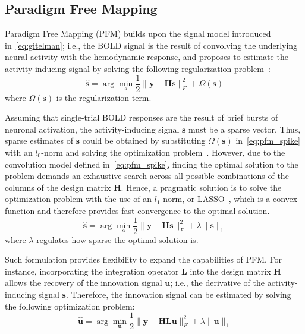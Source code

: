 \subsection{Paradigm Free Mapping}

Paradigm Free Mapping (PFM) builds upon the signal model introduced in~\eqref{eq:gitelman}; i.e., the BOLD signal is the result of convolving the underlying neural activity with the hemodynamic response, and proposes to estimate the activity-inducing signal by solving the following regularization problem~\cite{gaudes2011detection,gaudes2013paradigm,urunuela2020stability}:
\begin{equation}
    \label{eq:pfm}
    \hat{\mathbf{s}} = \arg \min_{\mathbf{s}} \frac{1}{2} \| \mathbf{y} - \mathbf{Hs} \|_F^2 + \Omega(\mathbf{s})
\end{equation}
where \(\Omega(\mathbf{s})\) is the regularization term.

Assuming that single-trial BOLD responses are the result of brief bursts of neuronal activation, the activity-inducing signal \(\mathbf{s}\) must be a sparse vector. Thus, sparse estimates of \(\mathbf{s}\) could be obtained by substituting \(\Omega(\mathbf{s})\) in~\eqref{eq:pfm_spike} with an \(l_0\)-norm and solving the optimization problem~\cite{bruckstein2009sparse}. However, due to the convolution model defined in~\eqref{eq:pfm_spike}, finding the optimal solution to the problem demands an exhaustive search across all possible combinations of the columns of the design matrix \(\mathbf{H}\). Hence, a pragmatic solution is to solve the optimization problem with the use of an \(l_1\)-norm, or LASSO~\cite{tibshirani1996regression}, which is a convex function and therefore provides fast convergence to the optimal solution.
\begin{equation}
    \label{eq:pfm_spike}
    \hat{\mathbf{s}} = \arg \min_{\mathbf{s}} \frac{1}{2} \| \mathbf{y} - \mathbf{Hs} \|_F^2 + \lambda \| \mathbf{s} \|_1
\end{equation}
where \(\lambda\) regulates how sparse the optimal solution is.

Such formulation provides flexibility to expand the capabilities of PFM. For instance, incorporating the integration operator \(\mathbf{L}\) into the design matrix \(\mathbf{H}\) allows the recovery of the innovation signal \(\mathbf{u}\); i.e., the derivative of the activity-inducing signal \(\mathbf{s}\). Therefore, the innovation signal can be estimated by solving the following optimization problem:
\begin{equation}
    \label{eq:pfm_block}
    \hat{\mathbf{u}} = \arg \min_{\mathbf{u}} \frac{1}{2} \| \mathbf{y} - \mathbf{HLu} \|_F^2 + \lambda \| \mathbf{u} \|_1
\end{equation}

